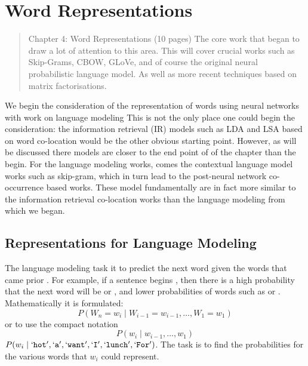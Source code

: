 \documentclass[parskip]{komatufte}
\begin{document}
\chapter{Word Representations}\label{sec:word-representations}
\begin{abstract}
Chapter 4: Word Representations (10 pages)
The core work that began to draw a lot of attention to this area.
This will cover crucial works such as Skip-Grams, CBOW, GLoVe, and of course the original neural probabilistic language model.
As well as more recent techniques based on matrix factorisations.
\end{abstract}

We begin the consideration of the representation of words using neural networks with work on language modeling
This is not the only place one could begin the consideration: the information retrieval (IR) models such as LDA and LSA based on word co-location would be the other obvious starting point.
However, as will be discussed there models are closer to the end point of of the chapter than the begin.
For the language modeling works, comes the contextual language model works such as skip-gram, which in turn lead to the post-neural network co-occurrence based works.
These model fundamentally are in fact more similar to the information retrieval co-location works than the language modeling from which we began.


\section{Representations for Language Modeling}


The language modeling task it to predict the next word given the words that came prior .
For example, if a sentence begins , then there is a high probability that the next word will be  or ,
and lower probabilities of words such as  or .
Mathematically it is formulated: 
\begin{equation}\label{equ:langmodel}
	P(W_n{=}w_i \mid W_{i-1}{=}w_{i-1}, \ldots, W_1{=}w_1)
\end{equation}
or to use the compact notation 
\begin{equation}\label{equ:langmodelcompact}
P(w_i \mid w_{i-1}, \ldots, w_1)
\end{equation}
$P(w_i \mid `\texttt{hot}', `\texttt{a}', `\texttt{want}', `\texttt{I}', `\texttt{lunch}', `\texttt{For}')$.
The task is to find the probabilities for the various words that $w_i$ could represent.
\end{document}
